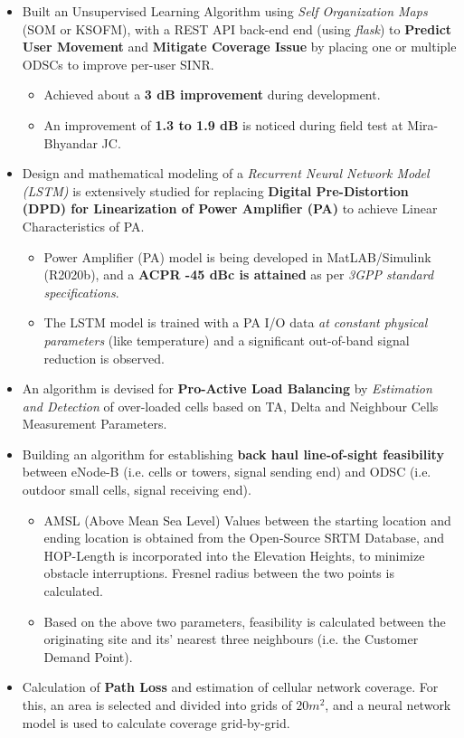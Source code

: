 \vspace{-7pt}

\begin{itemize}
	\item Built an Unsupervised Learning Algorithm using \textit{Self Organization Maps} (SOM or KSOFM), with a REST API back-end end (using \textit{flask}) to \textbf{Predict User Movement} and \textbf{Mitigate Coverage Issue} by placing one or multiple ODSCs to improve per-user SINR.
	\begin{itemize}
		\item Achieved about a \textbf{3 dB improvement} during development.
		\item An improvement of \textbf{1.3 to 1.9 dB} is noticed during field test at Mira-Bhyandar JC.
	\end{itemize}

	\item Design and mathematical modeling of a \textit{Recurrent Neural Network Model (LSTM)} is extensively studied for replacing \textbf{Digital Pre-Distortion (DPD) for Linearization of Power Amplifier (PA)} to achieve Linear Characteristics of PA.
	\begin{itemize}
		\item Power Amplifier (PA) model is being developed in MatLAB/Simulink (R2020b), and a \textbf{ACPR -45 dBc is attained} as per \textit{3GPP standard specifications}.
		\item The LSTM model is trained with a PA I/O data \textit{at constant physical parameters} (like temperature) and a significant out-of-band signal reduction is observed.
	\end{itemize}

	\item An algorithm is devised for \textbf{Pro-Active Load Balancing} by \textit{Estimation and Detection} of over-loaded cells based on TA, Delta and Neighbour Cells Measurement Parameters.

	\item Building an algorithm for establishing \textbf{back haul line-of-sight feasibility} between eNode-B (i.e. cells or towers, signal sending end) and ODSC (i.e. outdoor small cells, signal receiving end).

	\begin{itemize}
		\item AMSL (Above Mean Sea Level) Values between the starting location and ending location is obtained from the Open-Source SRTM Database, and HOP-Length is incorporated into the Elevation Heights, to minimize obstacle interruptions. Fresnel radius between the two points is calculated.

		\item Based on the above two parameters, feasibility is calculated between the originating site and its’ nearest three neighbours (i.e. the Customer Demand Point).
	\end{itemize}

	\item Calculation of \textbf{Path Loss} and estimation of cellular network coverage. For this, an area is selected and divided into grids of $20 m^2$, and a neural network model is used to calculate coverage grid-by-grid.
\end{itemize}


